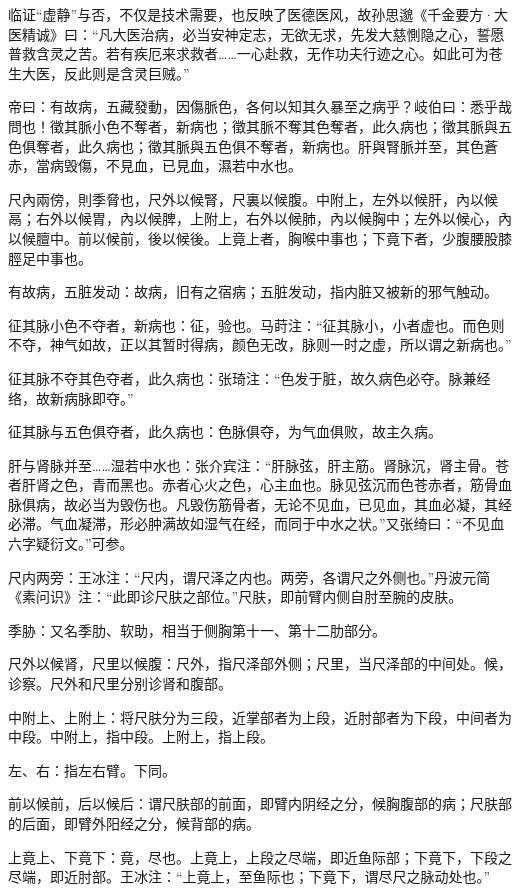 \documentclass[12pt]{ctexbook}
\begin{document}
临证“虚静”与否，不仅是技术需要，也反映了医德医风，故孙思邈《千金要方·大医精诚》曰：“凡大医治病，必当安神定志，无欲无求，先发大慈惻隐之心，誓愿普救含灵之苦。若有疾厄来求救者……一心赴救，无作功夫行迹之心。如此可为苍生大医，反此则是含灵巨贼。”


\begin{yuanwen}
帝曰：有故病，五藏發動，因傷脈色，各何以知其久暴至之病乎？岐伯曰：悉乎哉問也！徵其脈小色不奪者，新病也；徵其脈不奪其色奪者，此久病也；徵其脈與五色俱奪者，此久病也；徵其脈與五色俱不奪者，新病也。肝與腎脈并至，其色蒼赤，當病毁傷，不見血，已見血，濕若中水也。

尺內兩傍，則季脅也，尺外以候腎，尺裏以候腹。中附上，左外以候肝，內以候鬲；右外以候胃，內以候脾，上附上，右外以候肺，內以候胸中；左外以候心，內以候膻中。前以候前，後以候後。上竟上者，胸喉中事也；下竟下者，少腹腰股膝脛足中事也。
\end{yuanwen}


\begin{jiaozhu}
  \item 有故病，五脏发动：故病，旧有之宿病；五脏发动，指内脏又被新的邪气触动。
  \item 征其脉小色不夺者，新病也：征，验也。马莳注：“征其脉小，小者虚也。而色则不夺，神气如故，正以其暂时得病，颜色无改，脉则一时之虚，所以谓之新病也。”
  \item 征其脉不夺其色夺者，此久病也：张琦注：“色发于脏，故久病色必夺。脉兼经络，故新病脉即夺。”
  \item 征其脉与五色俱夺者，此久病也：色脉俱夺，为气血俱败，故主久病。
  \item 肝与肾脉并至……湿若中水也：张介宾注：“肝脉弦，肝主筋。肾脉沉，肾主骨。苍者肝肾之色，青而黑也。赤者心火之色，心主血也。脉见弦沉而色苍赤者，筋骨血脉俱病，故必当为毁伤也。凡毁伤筋骨者，无论不见血，已见血，其血必凝，其经必滞。气血凝滞，形必肿满故如湿气在经，而同于中水之状。”又张绮曰：“不见血六字疑衍文。”可参。
  \item 尺内两旁：王冰注：“尺内，谓尺泽之内也。两旁，各谓尺之外侧也。”丹波元简《素问识》注：“此即诊尺肤之部位。”尺肤，即前臂内侧自肘至腕的皮肤。
  \item 季胁：又名季肋、软助，相当于侧胸第十一、第十二肋部分。
  \item 尺外以候肾，尺里以候腹：尺外，指尺泽部外侧；尺里，当尺泽部的中间处。候，诊察。尺外和尺里分别诊肾和腹部。
  \item 中附上、上附上：将尺肤分为三段，近掌部者为上段，近肘部者为下段，中间者为中段。中附上，指中段。上附上，指上段。
  \item 左、右：指左右臂。下同。
  \item 前以候前，后以候后：谓尺肤部的前面，即臂内阴经之分，候胸腹部的病；尺肤部的后面，即臂外阳经之分，候背部的病。
  \item 上竟上、下竟下：竟，尽也。上竟上，上段之尽端，即近鱼际部；下竟下，下段之尽端，即近肘部。王冰注：“上竟上，至鱼际也；下竟下，谓尽尺之脉动处也。”
\end{jiaozhu}
\end{document}
